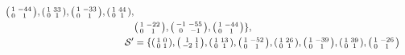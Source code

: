 \begin{itemize}
\begin{align*}
\begin{psmallmatrix}
1 & -44 \\ 0 & 1
\end{psmallmatrix},\begin{psmallmatrix}
1 & 33 \\ 0 & 1
\end{psmallmatrix},\begin{psmallmatrix}
1 & -33 \\ 0 & 1
\end{psmallmatrix},\begin{psmallmatrix}
1 & 44 \\ 0 & 1
\end{psmallmatrix},\\ &\begin{psmallmatrix}
1 & -22 \\ 0 & 1
\end{psmallmatrix},\begin{psmallmatrix}
-1 & -55 \\ 0 & -1
\end{psmallmatrix}, 
\begin{psmallmatrix}
1 & -44 \\ 0 & 1
\end{psmallmatrix}\}, \\
\mathcal{S}' &= \{\begin{psmallmatrix}
1 & 0 \\ 0 & 1
\end{psmallmatrix},\begin{psmallmatrix}
1 & 1 \\ -2 & 1
\end{psmallmatrix}, \begin{psmallmatrix}
1 & 13 \\ 0 & 1
\end{psmallmatrix},\begin{psmallmatrix}
1 & -52 \\ 0 & 1
\end{psmallmatrix},\begin{psmallmatrix}
1 & 26 \\ 0 & 1
\end{psmallmatrix},\begin{psmallmatrix}
1 & -39 \\ 0 & 1
\end{psmallmatrix},\begin{psmallmatrix}
1 & 39 \\ 0 & 1
\end{psmallmatrix}, \begin{psmallmatrix}
1 & -26 \\ 0 & 1

\end{psmallmatrix}
\end{align*}
\end{itemize}
